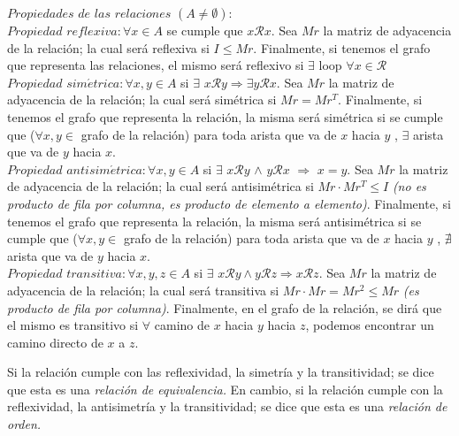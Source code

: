 \documentclass[titlepage,a4paper,12pt,twoside]{article}
\begin{document}
\begin{flushleft}
$Propiedades $ $ de $ $ las $ $ relaciones $ $(A \neq \emptyset):$\\
$ $\\
$Propiedad $ $reflexiva: \forall x \in A$ se cumple que $x \mathcal{R} x$. Sea $Mr$ la matriz de adyacencia de la relación; la cual será reflexiva si $I \leqslant Mr$. Finalmente, si tenemos el grafo que representa las relaciones, el mismo será reflexivo si $ \exists $ loop $ \forall x \in \mathcal{R} $ \\
$ $\\
$Propiedad $ $sim\acute{e}trica: \forall x,y \in A$ si $\exists $ $x \mathcal{R} y \Rightarrow  \exists y \mathcal{R} x$. Sea $Mr$ la matriz de adyacencia de la relación; la cual será simétrica si $Mr = Mr^T$. Finalmente, si tenemos el grafo que representa la relación, la misma será simétrica si se cumple que ($\forall x,y  \in $ grafo de la relación) para toda arista que va de $x$ hacia $y$ , $\exists$ arista que va de $y$ hacia $x$. \\
$ $\\
$Propiedad $ $antisim\acute{e}trica: \forall x,y \in A$ si $\exists $ $x \mathcal{R} y$ $\wedge$ $y \mathcal{R} x$ $\Rightarrow$ $x = y$. Sea $Mr$ la matriz de adyacencia de la relación; la cual será antisimétrica si $Mr \cdot Mr^T \leqslant I$ \textit{(no es producto de fila por columna, es producto de elemento a elemento)}. Finalmente, si tenemos el grafo que representa la relación, la misma será antisimétrica si se cumple que ($\forall x,y  \in $ grafo de la relación) para toda arista que va de $x$ hacia $y$ , $\nexists$ arista que va de $y$ hacia $x$. \\ 
$ $\\
$Propiedad $ $transitiva: \forall x,y,z \in A$ si $\exists $ $x \mathcal{R} y \wedge y \mathcal{R} z \Rightarrow x \mathcal{R} z$. Sea $Mr$ la matriz de adyacencia de la relación; la cual será transitiva si $Mr \cdot Mr = Mr^2 \leqslant Mr$ \textit{(es producto de fila por columna)}. Finalmente, en el grafo de la relación, se dirá que el mismo es transitivo si $\forall$ camino de $x$ hacia $y$ hacia $z$, podemos encontrar un camino directo de $x$ a $z$.\\
$ $\\
\end{flushleft}

Si la relación cumple con las reflexividad, la simetría y la transitividad; se dice que esta es una \textit{relación de equivalencia.} En cambio, si la relación cumple con la reflexividad, la antisimetría y la transitividad; se dice que esta es una \textit{relación de orden.}\\
\end{document}
